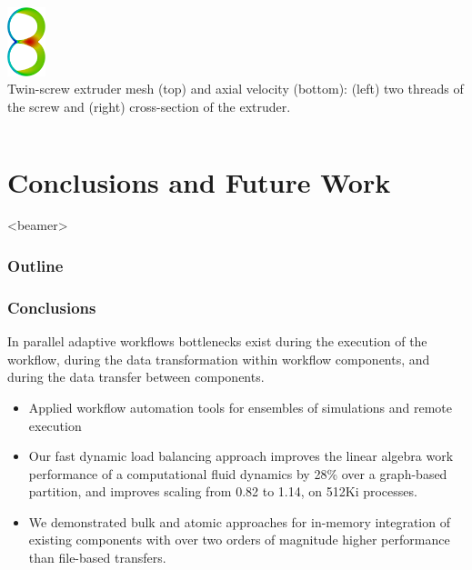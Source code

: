 \documentclass{beamer}
\newcommand{\outline}{
  \begin{frame}<beamer>
    \frametitle{Outline}
    \tableofcontents[currentsection]
  \end{frame}
}
\begin{document}
\begin{frame}
\begin{columns}
\begin{column}{0.5\textwidth}
      \includegraphics[height=2.0cm,keepaspectratio]{../applications/figures/tseFlowCrossSection.png}\\
      \small
      Twin-screw extruder mesh (top) and axial velocity (bottom): (left) two
      threads of the screw and (right) cross-section of the extruder.
    \end{column}
  \end{columns}
\end{frame}

\section{Conclusions and Future Work}
\outline

\begin{frame}
  \frametitle{Conclusions}
  In parallel adaptive workflows bottlenecks exist during the 
  execution of the workflow, during the data transformation within workflow
  components, and during the data transfer between components.
  \medskip
  \begin{itemize}
    \item Applied workflow automation tools for ensembles of simulations and
      remote execution
    \item Our fast dynamic load balancing approach improves the linear algebra work
      performance of a computational fluid dynamics by 28\% over a graph-based
      partition, and improves scaling from 0.82 to 1.14, on 512Ki processes.
    \item We demonstrated bulk and atomic approaches for in-memory integration of
      existing components with over two orders of magnitude higher performance
      than file-based transfers.
  \end{itemize}
\end{frame}
\end{document}
